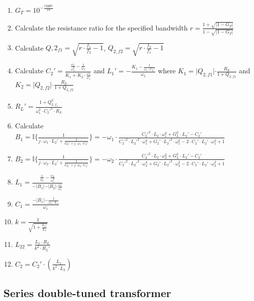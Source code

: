 \begin{enumerate}
  \item $G_T = 10^{-\frac{ripple}{10}}$
  \item Calculate the resistance ratio for the specified bandwidth $r = \frac{1  + \sqrt{\lvert 1  - G_T \lvert}}{1  - \sqrt{\lvert 1  - G_T \lvert}}$
  \item Calculate $Q,{2_{f1}} = \sqrt{r \cdot \frac{f_1}{f_2} - 1}$, $Q_{2,{f2}} = \sqrt{r \cdot \frac{f_2}{f_1} - 1}$
  \item Calculate $C_2' = \frac{\frac{\omega_2}{\omega_1^2} - \frac{1}{\omega_2}}{K_1 + K_2 \cdot \frac{\omega_2}{\omega_1}}$ and $L_1' = -\frac{K_1 - \frac{1}{\omega_1 \cdot C_2'}}{\omega_1}$ where $K_1 = \lvert Q_{2, {f1}} \lvert \cdot \frac{R_S}{1 + Q_{2,{f1}}}$ and $K_2 = \lvert Q_{2,{f2}} \lvert \cdot \frac{R_S}{1 + Q_{2,{f2}}}$
  \item $R_L' = \frac{1 + Q^2_{2, f_1}}{\omega_1^2 \cdot C_2'^2 \cdot R_S}$
  \item Calculate $B_1 = \mathbb{I} \lbrace \frac{1}{j \cdot \omega_1 \cdot L_2' + \frac{1}{G_2' + j\cdot \omega_1 \cdot C_2'}} \rbrace = -\omega_1 \cdot \frac{C_2'^2 \cdot L_2 \cdot \omega_1^2 + G_L^2 \cdot L_2' -C_2'}{C_2'^2 \cdot L_2'^2 \cdot \omega_1^4 + G_2'\cdot L_2'^2 \cdot \omega_1^2 - 2 \cdot C_2' \cdot L_2' \cdot \omega_1^2 + 1}$
  \item $B_2 = \mathbb{I} \lbrace \frac{1}{j \cdot \omega_2 \cdot L_2' + \frac{1}{G_2' + j\cdot \omega_2 \cdot C_2'}} \rbrace = -\omega_2 \cdot \frac{C_2'^2 \cdot L_2 \cdot \omega_2^2 + G_L^2 \cdot L_2' -C_2'}{C_2'^2 \cdot L_2'^2 \cdot \omega_2^4 + G_2'\cdot L_2'^2 \cdot \omega_2^2 - 2 \cdot C_2' \cdot L_2' \cdot \omega_2^2 + 1}$
  \item $L_1 = \frac{\frac{1}{\omega_2} - \frac{\omega_2}{\omega_1^2}}{- \lvert B_1 \lvert - \lvert B_2 \lvert \cdot \frac{\omega_2}{\omega_1}}$
  \item $C_1 = \frac{-\lvert B_1 \lvert - \frac{1}{\omega_1 \cdot L_1}}{\omega_1}$
  \item $k = \frac{1}{\sqrt{1 + \frac{L_2'}{L_1}}}$
  \item $L_{22} = \frac{L_1 \cdot R_L}{k^2 \cdot R_L'} $
  \item $C_2 = C_2' \cdot \left( \frac{L_1}{k^2 \cdot L_2} \right)$
\end{enumerate}


\subsection{Series double-tuned transformer}


